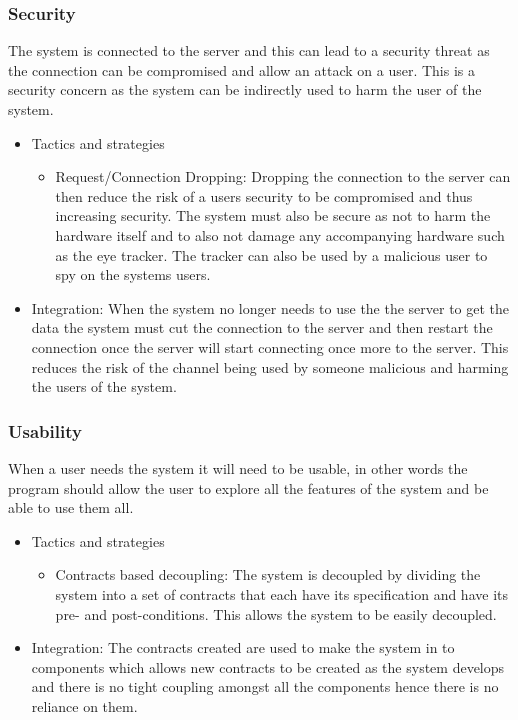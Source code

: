 \subsubsection{Security}	
\begin{flushleft}
The system is connected to the server and this can lead to a security threat as the connection can be compromised and allow an attack on a user. This is a security concern as the system can be indirectly used to harm the user of the system.
\begin{itemize}
\item{Tactics and strategies}
\begin{itemize}
\item{Request/Connection Dropping}: Dropping the connection to the server can then reduce the risk of a users security to be compromised and thus increasing security. The system must also be secure as not to harm the hardware itself and to also not damage any accompanying hardware such as the eye tracker. The tracker can also be used by a malicious user to spy on the systems users.

\end{itemize}

\item{Integration}: When the system no longer needs to use the the server to get the data the system must cut the connection to the server and then restart the connection once the server will start connecting once more to the server. This reduces the risk of the channel being used by someone malicious and harming the users of the system.
\end{itemize}

\end{flushleft}	

\subsubsection{Usability}
\begin{flushleft}
When a user needs the system it will need to be usable, in other words the program should allow the user to explore all the features of the system and be able to use them all.
\begin{itemize}
\item{Tactics and strategies}
\begin{itemize}
\item{Contracts based decoupling}: The system is decoupled by dividing the system into a set of contracts that each have its specification and have its pre- and post-conditions. This allows the system to be easily decoupled.

\end{itemize}

\item{Integration}: The contracts created are used to make the system in to components which allows new contracts to be created as the system develops and there is no tight coupling amongst all the components hence there is no reliance on them.
\end{itemize}

\end{flushleft}
		
